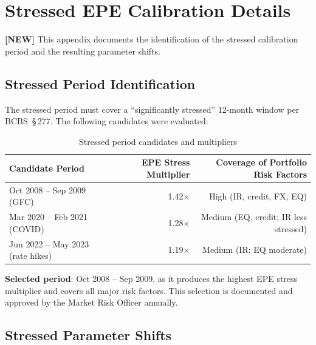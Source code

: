 \documentclass[11pt,a4paper]{article}
\begin{document}
\section{Stressed EPE Calibration Details}
\label{app:stressed_epe}

\textbf{[NEW]} This appendix documents the identification of the stressed
calibration period and the resulting parameter shifts.

\subsection*{Stressed Period Identification}

The stressed period must cover a ``significantly stressed'' 12-month window
per BCBS~\S\,277. The following candidates were evaluated:

\begin{table}[h!]
\centering
\begin{tabular}{@{}lrr@{}}
\toprule
\textbf{Candidate Period} & \textbf{EPE Stress Multiplier} & \textbf{Coverage of Portfolio Risk Factors} \\
\midrule
Oct 2008 -- Sep 2009 (GFC)   & 1.42$\times$ & High (IR, credit, FX, EQ) \\
Mar 2020 -- Feb 2021 (COVID) & 1.28$\times$ & Medium (EQ, credit; IR less stressed) \\
Jun 2022 -- May 2023 (rate hikes) & 1.19$\times$ & Medium (IR; EQ moderate) \\
\bottomrule
\end{tabular}
\caption{Stressed period candidates and multipliers}
\end{table}

\textbf{Selected period}: Oct 2008 -- Sep 2009, as it produces the highest
EPE stress multiplier and covers all major risk factors. This selection is
documented and approved by the Market Risk Officer annually.

\subsection*{Stressed Parameter Shifts}
\end{document}

